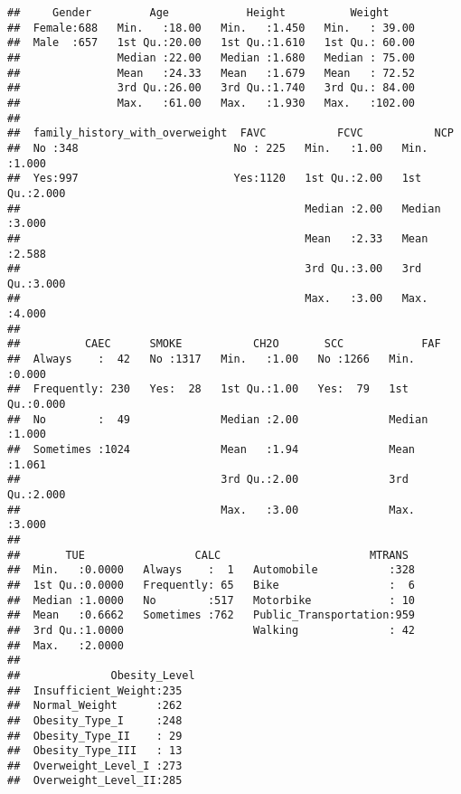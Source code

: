 \documentclass[
]{article}
\begin{document}
\begin{verbatim}
##     Gender         Age            Height          Weight      
##  Female:688   Min.   :18.00   Min.   :1.450   Min.   : 39.00  
##  Male  :657   1st Qu.:20.00   1st Qu.:1.610   1st Qu.: 60.00  
##               Median :22.00   Median :1.680   Median : 75.00  
##               Mean   :24.33   Mean   :1.679   Mean   : 72.52  
##               3rd Qu.:26.00   3rd Qu.:1.740   3rd Qu.: 84.00  
##               Max.   :61.00   Max.   :1.930   Max.   :102.00  
##                                                               
##  family_history_with_overweight  FAVC           FCVC           NCP       
##  No :348                        No : 225   Min.   :1.00   Min.   :1.000  
##  Yes:997                        Yes:1120   1st Qu.:2.00   1st Qu.:2.000  
##                                            Median :2.00   Median :3.000  
##                                            Mean   :2.33   Mean   :2.588  
##                                            3rd Qu.:3.00   3rd Qu.:3.000  
##                                            Max.   :3.00   Max.   :4.000  
##                                                                          
##          CAEC      SMOKE           CH2O       SCC            FAF       
##  Always    :  42   No :1317   Min.   :1.00   No :1266   Min.   :0.000  
##  Frequently: 230   Yes:  28   1st Qu.:1.00   Yes:  79   1st Qu.:0.000  
##  No        :  49              Median :2.00              Median :1.000  
##  Sometimes :1024              Mean   :1.94              Mean   :1.061  
##                               3rd Qu.:2.00              3rd Qu.:2.000  
##                               Max.   :3.00              Max.   :3.000  
##                                                                        
##       TUE                 CALC                       MTRANS   
##  Min.   :0.0000   Always    :  1   Automobile           :328  
##  1st Qu.:0.0000   Frequently: 65   Bike                 :  6  
##  Median :1.0000   No        :517   Motorbike            : 10  
##  Mean   :0.6662   Sometimes :762   Public_Transportation:959  
##  3rd Qu.:1.0000                    Walking              : 42  
##  Max.   :2.0000                                               
##                                                               
##              Obesity_Level
##  Insufficient_Weight:235  
##  Normal_Weight      :262  
##  Obesity_Type_I     :248  
##  Obesity_Type_II    : 29  
##  Obesity_Type_III   : 13  
##  Overweight_Level_I :273  
##  Overweight_Level_II:285
\end{verbatim}
\end{document}
